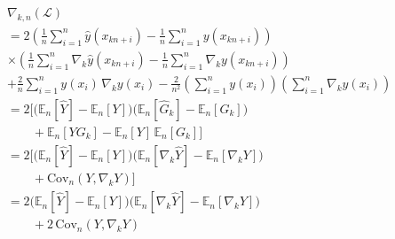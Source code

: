 \documentclass[
  journal=largetwo,
  year=2025,
  volume=37,
]{cup-journal}
\begin{document}
\begin{equation}
\begin{split}
    &\nabla_{k,n}(\mathcal{L}) \\
&= 2\left(
      \frac{1}{n}\sum_{i=1}^{n}\hat{y}(x_{kn+i})
      - \frac{1}{n}\sum_{i=1}^{n}y(x_{kn+i})
   \right) \\
   & 
   \times \left(
      \frac{1}{n}\sum_{i=1}^{n}\nabla_k \hat{y}(x_{kn+i})
      - \frac{1}{n}\sum_{i=1}^{n}\nabla_k y(x_{kn+i})
   \right) \nonumber\\ %
&
   + \frac{2}{n}\sum_{i=1}^{n} y(x_i)\,\nabla_k y(x_i)
   - \frac{2}{n^2}
     \left( \sum_{i=1}^{n} y(x_i) \right)
     \left( \sum_{i=1}^{n} \nabla_k y(x_i) \right) \\
&= 2\Big[
      \big( \mathbb{E}_n[\hat{Y}] - \mathbb{E}_n[Y] \big)
      \big( \mathbb{E}_n[\hat{G}_k] - \mathbb{E}_n[G_k] \big) \\
      & \quad \quad 
      + \mathbb{E}_n[Y G_k]
      - \mathbb{E}_n[Y]\,\mathbb{E}_n[G_k]
   \Big] \\ 
& = 2\Big[
      \big( \mathbb{E}_n[\hat{Y}] - \mathbb{E}_n[Y] \big)
      \big( \mathbb{E}_n[\nabla_k \hat{Y}] - \mathbb{E}_n[\nabla_k Y] \big)\\
& \quad \quad + \mathrm{Cov}_n(Y,\nabla_k Y) \Big] \\ 
& = 2 \big( \mathbb{E}_n[\hat{Y}] - \mathbb{E}_n[Y] \big) \big( \mathbb{E}_n[\nabla_k \hat{Y}] - \mathbb{E}_n[\nabla_k Y] \big) \\
& \quad \quad + 2\,\mathrm{Cov}_n(Y,\nabla_k Y)
\end{split}
\end{equation}
\end{document}
